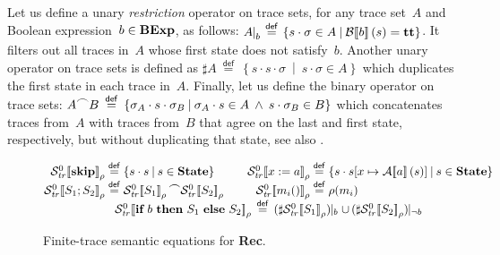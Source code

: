 \documentclass[10pt,a4paper]{amsart}
\theoremstyle{definition}
\newcommand{\bordertext}[1]{\setlength{\fboxsep}{5pt}\setlength{\fboxrule}{0.5pt}\fbox{\parbox[c]{0.95\textwidth}{#1}}}
\newcommand{\defeq}{\stackrel{\mathsf{def}}{=}}
\newcommand{\setdef}[2]{\left\{ #1 \>\middle|\> #2 \right\}}
\newcommand{\denot}[1]{\left[\!\left[#1\right]\!\right]}
\newcommand{\arexdenot}[1]{\mathcal{A}\!\denot{#1}}
\newcommand{\bexdenot}[1]{\mathcal{B}\!\denot{#1}}
\newcommand{\trcdenoth}[1]{\mathcal{S}^0_{\mathit{tr}}\!\denot{#1}}
\newcommand{\restr}[2]{\!\!\mid_{#1}^{#2}}
\newcommand{\chop}[0]{\raisebox{1ex}{$\frown$}}
\newcommand{\Rec}{\mbox{\bf Rec}}
\newcommand{\BExp}{\mbox{\bf BExp}}
\newcommand{\Skip}{\mbox{\bf skip}}
\newcommand{\If}{\mbox{\bf if}}
\newcommand{\Then}{\mbox{\bf then}}
\newcommand{\Else}{\mbox{\bf else}}
\newcommand{\ttt}{\mbox{\bf tt}}
\newcommand{\State}{\mbox{\bf State}}
\begin{document}


Let us define a unary \emph{restriction} operator on trace sets, 
for any trace set~$A$ and Boolean expression~$b \in \BExp$, as follows:
%
$
\begin{array}{@{}l@{\,}c@{\,}l@{}}
  A \restr{b}{} & \>\defeq\> & \setdef{s \cdot \sigma \in A}{\bexdenot{b} (s) = \ttt}
\end{array}
$.
%
It filters out all traces in~$A$ whose first state does not
satisfy~$b$.
%
Another unary operator on trace sets is defined as
%
$
\sharp A \>\defeq\> 
\setdef{s \cdot s \cdot \sigma}{s \cdot \sigma \in A}
$
%
which duplicates the first state in each trace in~$A$.
%
Finally, let us define the binary operator on trace sets:
%
$ A \chop B \>\defeq\> \setdef{\sigma_A \cdot s \cdot \sigma_B}
{\sigma_A \cdot s \in A \>\wedge\> s \cdot \sigma_B \in B} $
%
which concatenates traces from~$A$ with traces from~$B$ that agree on
the last and first state, respectively, but without duplicating that
state, see also \cite{HalpernShoham91}.




\begin{figure}
  \centering
$ \begin{array}{@{}r@{\;}c@{\;}l@{\qquad}r@{\;}c@{\;}l@{}}
   \trcdenoth{\Skip}_\rho  & \defeq & 
      \setdef{s \cdot s}{s \in \State} &
   \trcdenoth{x := a}_\rho & \defeq & 
      \setdef{s \cdot s[x \mapsto \arexdenot{a} (s)]}{s \in \State} \\
   \trcdenoth{S_1 ; S_2}_\rho  & \defeq & 
      \trcdenoth{S_1}_\rho \chop \trcdenoth{S_2}_\rho & 
   \trcdenoth{m_i ()}_\rho & \defeq & \rho(m_i) \\ 
    \multicolumn{6}{c}{%
    \trcdenoth{\If\ b\ \Then\ S_1\ \Else\ S_2}_\rho   \,\defeq\,  
      (\sharp \trcdenoth{S_1}_\rho) \!\!\mid_b \cup\, 
      (\sharp \trcdenoth{S_2}_\rho) \!\!\mid_{\neg b}}      \\
   \end{array} $
\caption{Finite-trace semantic equations for \Rec.}
\label{fig:while-tr}
\end{figure}
\end{document}
